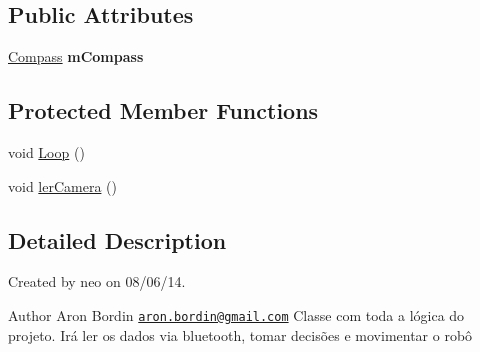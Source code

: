 \subsection*{Public Attributes}
\begin{DoxyCompactItemize}
\item 
\hypertarget{classcom_1_1aronbordin_1_1robo_1_1camera_1_1Robo_a21717aef50f6816afe957cce92e359d1}{\hyperlink{classcom_1_1aronbordin_1_1robo_1_1camera_1_1Compass}{Compass} {\bfseries m\+Compass}}\label{classcom_1_1aronbordin_1_1robo_1_1camera_1_1Robo_a21717aef50f6816afe957cce92e359d1}

\end{DoxyCompactItemize}
\subsection*{Protected Member Functions}
\begin{DoxyCompactItemize}
\item 
void \hyperlink{classcom_1_1aronbordin_1_1robo_1_1camera_1_1Robo_a390e1e83b708d7c8da9a87d76ac95638}{Loop} ()
\item 
void \hyperlink{classcom_1_1aronbordin_1_1robo_1_1camera_1_1Robo_a3f7c9e59781e7f0d6a78d5ff6182b18e}{ler\+Camera} ()
\end{DoxyCompactItemize}


\subsection{Detailed Description}
Created by neo on 08/06/14. \begin{DoxyAuthor}{Author}
Aron Bordin \href{mailto:aron.bordin@gmail.com}{\tt aron.\+bordin@gmail.\+com} Classe com toda a lógica do projeto. Irá ler os dados via bluetooth, tomar decisões e movimentar o robô 
\end{DoxyAuthor}


